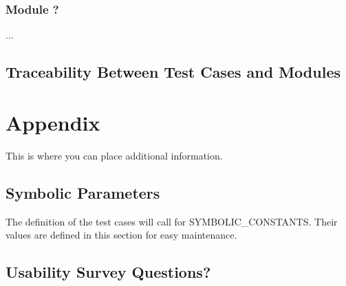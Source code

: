 \documentclass[12pt, titlepage]{article}
\begin{document}
\subsubsection{Module ?}

...

\subsection{Traceability Between Test Cases and Modules}

				




\newpage

\section{Appendix}

This is where you can place additional information.

\subsection{Symbolic Parameters}

The definition of the test cases will call for SYMBOLIC\_CONSTANTS.
Their values are defined in this section for easy maintenance.

\subsection{Usability Survey Questions?} \label{usab}
\end{document}
